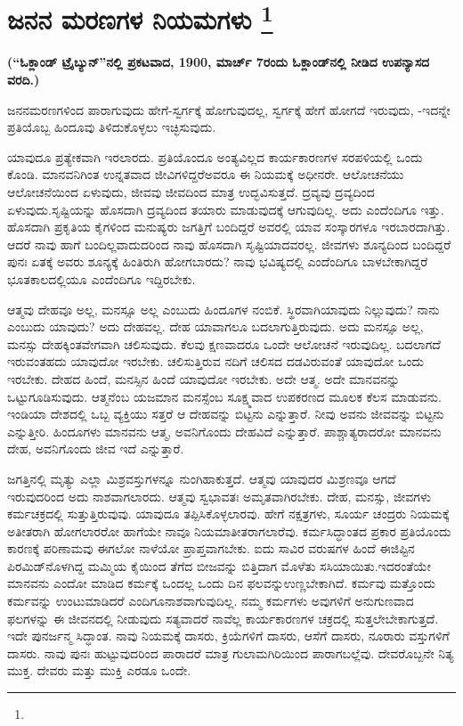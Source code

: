 
\chapter[ಜನನ ಮರಣಗಳ ನಿಯಮಗಳು ]{ಜನನ ಮರಣಗಳ ನಿಯಮಗಳು \protect\footnote{}}

\begin{center}
\textbf{(“ಓಕ್ಲಾಂಡ್​ ಟ್ರೈಬ್ಯುನ್​”ನಲ್ಲಿ ಪ್ರಕಟವಾದ, 1900, ಮಾರ್ಚ್​ 7ರಂದು ಓಕ್ಲಾಂಡ್​ನಲ್ಲಿ ನೀಡಿದ ಉಪನ್ಯಾಸದ ವರದಿ.)}
\end{center}

ಜನನಮರಣಗಳಿಂದ ಪಾರಾಗುವುದು ಹೇಗೆ-ಸ್ವರ್ಗಕ್ಕೆ ಹೋಗುವುದಲ್ಲ, ಸ್ವರ್ಗಕ್ಕೆ ಹೇಗೆ ಹೋಗದೆ ಇರುವುದು, -ಇದನ್ನೇ ಪ್ರತಿಯೊಬ್ಬ ಹಿಂದೂವು ತಿಳಿದುಕೊಳ್ಳಲು ಇಚ್ಛಿಸುವುದು.

ಯಾವುದೂ ಪ್ರತ್ಯೇಕವಾಗಿ ಇರಲಾರದು. ಪ್ರತಿಯೊಂದೂ ಅಂತ್ಯವಿಲ್ಲದ ಕಾರ್ಯಕಾರಣಗಳ ಸರಪಳಿಯಲ್ಲಿ ಒಂದು ಕೊಂಡಿ. ಮಾನವನಿಗಿಂತ ಉನ್ನತವಾದ ಜೀವಿಗಳಿದ್ದರೆ\break ಅವರೂ ಈ ನಿಯಮಕ್ಕೆ ಅಧೀನರೇ. ಆಲೋಚನೆಯು ಆಲೋಚನೆಯಿಂದ ಏಳುವುದು, ಜೀವವು ಜೀವದಿಂದ ಮಾತ್ರ ಉದ್ಭವಿಸುತ್ತದೆ. ದ್ರವ್ಯವು ದ್ರವ್ಯದಿಂದ ಏಳುವುದು.\break ಸೃಷ್ಟಿಯನ್ನು ಹೊಸದಾಗಿ ದ್ರವ್ಯದಿಂದ ತಯಾರು ಮಾಡುವುದಕ್ಕೆ ಆಗುವುದಿಲ್ಲ. ಅದು ಎಂದೆಂದಿಗೂ ಇತ್ತು. ಹೊಸದಾಗಿ ಪ್ರಕೃತಿಯ ಕೈಗಳಿಂದ ಮನುಷ್ಯರು ಜಗತ್ತಿಗೆ ಬಂದಿದ್ದರೆ ಅವರಲ್ಲಿ ಯಾವ ಸಂಸ್ಕಾರಗಳೂ ಇರಬಾರದಾಗಿತ್ತು. ಆದರೆ ನಾವು ಹಾಗೆ ಬಂದಿಲ್ಲವಾದುದರಿಂದ ನಾವು ಹೊಸದಾಗಿ ಸೃಷ್ಟಿಯಾದವರಲ್ಲ. ಜೀವಗಳು ಶೂನ್ಯದಿಂದ ಬಂದಿದ್ದರೆ ಪುನಃ ಏತಕ್ಕೆ ಅವರು ಶೂನ್ಯಕ್ಕೆ ಹಿಂತಿರುಗಿ ಹೋಗಬಾರದು? ನಾವು ಭವಿಷ್ಯದಲ್ಲಿ ಎಂದೆಂದಿಗೂ ಬಾಳಬೇಕಾಗಿದ್ದರೆ ಭೂತಕಾಲದಲ್ಲಿಯೂ ಎಂದೆಂದಿಗೂ ಇದ್ದಿರಬೇಕು.

ಆತ್ಮವು ದೇಹವೂ ಅಲ್ಲ, ಮನಸ್ಸೂ ಅಲ್ಲ ಎಂಬುದು ಹಿಂದೂಗಳ ನಂಬಿಕೆ. ಸ್ಥಿರವಾಗಿ\break ಯಾವುದು ನಿಲ್ಲುವುದು? ನಾನು ಎಂಬುದು ಯಾವುದು? ಅದು ದೇಹವಲ್ಲ. ದೇಹ ಯಾವಾಗಲೂ ಬದಲಾಗುತ್ತಿರುವುದು. ಅದು ಮನಸ್ಸೂ ಅಲ್ಲ, ಮನಸ್ಸು ದೇಹಕ್ಕಿಂತ\break ವೇಗವಾಗಿ ಚಲಿಸುವುದು. ಕೆಲವು ಕ್ಷಣವಾದರೂ ಒಂದೇ ಆಲೋಚನೆ ಇರುವುದಿಲ್ಲ. ಬದಲಾಗದೆ ಇರುವಂತಹದು ಯಾವುದೋ ಇರಬೇಕು. ಚಲಿಸುತ್ತಿರುವ ನದಿಗೆ ಚಲಿಸದ ದಡವಿರುವಂತೆ ಯಾವುದೋ ಒಂದು ಇರಬೇಕು. ದೇಹದ ಹಿಂದೆ, ಮನಸ್ಸಿನ ಹಿಂದೆ ಯಾವುದೋ ಇರಬೇಕು. ಅದೇ ಆತ್ಮ. ಅದೇ ಮಾನವನನ್ನು ಒಟ್ಟುಗೂಡಿಸುವುದು. ಆತ್ಮನೆಂಬ ಯಜಮಾನ ಮನಸ್ಸೆಂಬ ಸೂಕ್ಷ್ಮವಾದ ಉಪಕರಣದ ಮೂಲಕ ಕೆಲಸ ಮಾಡುವನು. ಇಂಡಿಯಾ ದೇಶದಲ್ಲಿ ಒಬ್ಬ ವ್ಯಕ್ತಿಯು ಸತ್ತರೆ ಆ ದೇಹವನ್ನು ಬಿಟ್ಟನು ಎನ್ನುತ್ತಾರೆ. ನೀವು ಅವನು ಜೀವವನ್ನು ಬಿಟ್ಟನು ಎನ್ನುತ್ತೀರಿ. ಹಿಂದೂಗಳು ಮಾನವನು ಆತ್ಮ, ಅವನಿಗೊಂದು ದೇಹವಿದೆ ಎನ್ನುತ್ತಾರೆ. ಪಾಶ್ಚಾತ್ಯರಾದರೋ ಮಾನವನು ದೇಹ, ಅವನಿಗೊಂದು ಜೀವ ಇದೆ ಎನ್ನುತ್ತಾರೆ.

ಜಗತ್ತಿನಲ್ಲಿ ಮೃತ್ಯು ಎಲ್ಲಾ ಮಿಶ್ರವಸ್ತುಗಳನ್ನೂ ನುಂಗಿಹಾಕುತ್ತದೆ. ಆತ್ಮವು ಯಾವುದರ ಮಿಶ್ರಣವೂ ಆಗದೆ ಇರುವುದರಿಂದ ಅದು ನಾಶವಾಗಲಾರದು. ಆತ್ಮವು ಸ್ವಭಾವತಃ ಅಮೃತವಾಗಿರಬೇಕು. ದೇಹ, ಮನಸ್ಸು, ಜೀವಗಳು ಕರ್ಮಚಕ್ರದಲ್ಲಿ ಸುತ್ತುತ್ತಿರುವುವು. ಯಾವುದೂ ತಪ್ಪಿಸಿಕೊಳ್ಳಲಾರವು. ಹೇಗೆ ನಕ್ಷತ್ರಗಳು, ಸೂರ್ಯ ಚಂದ್ರರು ನಿಯಮಕ್ಕೆ ಅತೀತರಾಗಿ ಹೋಗಲಾರರೋ ಹಾಗೆಯೇ ನಾವೂ ನಿಯಮಾತೀತರಾಗಲಾರೆವು. ಕರ್ಮಸಿದ್ಧಾಂತದ ಪ್ರಕಾರ ಪ್ರತಿಯೊಂದು ಕಾರಣಕ್ಕೆ ಪರಿಣಾಮವು ಈಗಲೋ ನಾಳೆಯೋ ಪ್ರಾಪ್ತವಾಗಬೇಕು. ಐದು ಸಾವಿರ ವರುಷಗಳ ಹಿಂದೆ ಈಜಿಪ್ಟಿನ ಪಿರಮಿಡ್​ನೊಳಗಿದ್ದ ಮಮ್ಮಿಯ ಕೈಯಿಂದ ತೆಗೆದ ಬೀಜವನ್ನು ಬಿತ್ತಿದಾಗ ಮೊಳೆತು ಸಸಿಯಾಯಿತು.\break ಇದರಂತೆಯೇ ಮಾನವನು ಎಂದೋ ಮಾಡಿದ ಕರ್ಮಕ್ಕೆ ಒಂದಲ್ಲ ಒಂದು ದಿನ ಫಲವನ್ನು\break ಉಣ್ಣಬೇಕಾಗಿದೆ. ಕರ್ಮವು ಮತ್ತೊಂದು ಕರ್ಮವನ್ನು ಉಂಟುಮಾಡಿದರೆ ಎಂದಿಗೂ\break ನಾಶವಾಗುವುದಿಲ್ಲ. ನಮ್ಮ ಕರ್ಮಗಳು ಅವುಗಳಿಗೆ ಅನುಗುಣವಾದ ಫಲಗಳನ್ನು ಈ ಜೀವನದಲ್ಲಿ ನೀಡುವುದು ಸತ್ಯವಾದರೆ ನಾವೆಲ್ಲ ಕಾರ್ಯಕಾರಣಗಳ ಚಕ್ರದಲ್ಲಿ ಸುತ್ತಲೇಬೇಕಾಗುತ್ತದೆ. ಇದೇ ಪುನರ್ಜನ್ಮ ಸಿದ್ಧಾಂತ. ನಾವು ನಿಯಮಕ್ಕೆ ದಾಸರು, ಕ್ರಿಯೆಗಳಿಗೆ ದಾಸರು, ಆಸೆಗೆ ದಾಸರು, ನೂರಾರು ವಸ್ತುಗಳಿಗೆ ದಾಸರು. ನಾವು ಪುನಃ ಹುಟ್ಟುವುದರಿಂದ ಪಾರಾದರೆ ಮಾತ್ರ ಗುಲಾಮಗಿರಿಯಿಂದ ಪಾರಾಗಬಲ್ಲೆವು. ದೇವರೊಬ್ಬನೇ ನಿತ್ಯ ಮುಕ್ತ. ದೇವರು ಮತ್ತು ಮುಕ್ತಿ ಎರಡೂ ಒಂದೇ.

